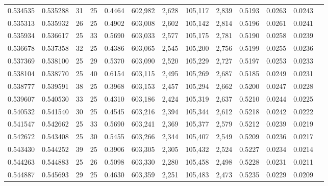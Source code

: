\begin{tabular}{rrrrrrrrrrrrr}
0.534535 & 0.535288 &    31 &  25 &                                     0.4464 & 602,982 &   2,628 & 105,117 &   2,839 & 0.5193 & 0.0263 & 0.0243 \\
0.535313 & 0.535932 &    26 &  25 &                                     0.4902 & 603,008 &   2,602 & 105,142 &   2,814 & 0.5196 & 0.0261 & 0.0241 \\
0.535934 & 0.536617 &    25 &  33 &                                     0.5690 & 603,033 &   2,577 & 105,175 &   2,781 & 0.5190 & 0.0258 & 0.0239 \\
0.536678 & 0.537358 &    32 &  25 &                                     0.4386 & 603,065 &   2,545 & 105,200 &   2,756 & 0.5199 & 0.0255 & 0.0236 \\
0.537369 & 0.538100 &    25 &  29 &                                     0.5370 & 603,090 &   2,520 & 105,229 &   2,727 & 0.5197 & 0.0253 & 0.0233 \\
0.538104 & 0.538770 &    25 &  40 &                                     0.6154 & 603,115 &   2,495 & 105,269 &   2,687 & 0.5185 & 0.0249 & 0.0231 \\
0.538777 & 0.539591 &    38 &  25 &                                     0.3968 & 603,153 &   2,457 & 105,294 &   2,662 & 0.5200 & 0.0247 & 0.0228 \\
0.539607 & 0.540530 &    33 &  25 &                                     0.4310 & 603,186 &   2,424 & 105,319 &   2,637 & 0.5210 & 0.0244 & 0.0225 \\
0.540532 & 0.541540 &    30 &  25 &                                     0.4545 & 603,216 &   2,394 & 105,344 &   2,612 & 0.5218 & 0.0242 & 0.0222 \\
0.541547 & 0.542662 &    25 &  33 &                                     0.5690 & 603,241 &   2,369 & 105,377 &   2,579 & 0.5212 & 0.0239 & 0.0219 \\
0.542672 & 0.543408 &    25 &  30 &                                     0.5455 & 603,266 &   2,344 & 105,407 &   2,549 & 0.5209 & 0.0236 & 0.0217 \\
0.543430 & 0.544252 &    39 &  25 &                                     0.3906 & 603,305 &   2,305 & 105,432 &   2,524 & 0.5227 & 0.0234 & 0.0214 \\
0.544263 & 0.544883 &    25 &  26 &                                     0.5098 & 603,330 &   2,280 & 105,458 &   2,498 & 0.5228 & 0.0231 & 0.0211 \\
0.544887 & 0.545693 &    29 &  25 &                                     0.4630 & 603,359 &   2,251 & 105,483 &   2,473 & 0.5235 & 0.0229 & 0.0209 \\

\end{tabular}
